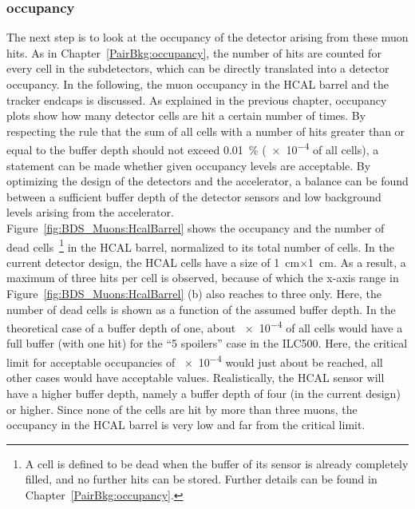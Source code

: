 \subsubsection{\sid occupancy}
\label{BDS_Muons:sidocc}
The next step is to look at the occupancy of the detector arising from these muon hits.
As in Chapter~\ref{PairBkg:occupancy}, the number of hits are counted for every cell in the subdetectors, which can be directly translated into a detector occupancy.
In the following, the muon occupancy in the \sid HCAL barrel and the tracker endcaps is discussed.
As explained in the previous chapter, occupancy plots show how many detector cells are hit a certain number of times. 
By respecting the rule that the sum of all cells with a number of hits greater than or equal to the buffer depth should not exceed \SI{0.01}{\percent} (\num{e-4} of all cells), a statement can be made whether given occupancy levels are acceptable.
By optimizing the design of the detectors and the accelerator, a balance can be found between a sufficient buffer depth of the detector sensors and low background levels arising from the accelerator.
\\Figure~\ref{fig:BDS_Muons:HcalBarrel} shows the occupancy and the number of dead cells~\footnote{A cell is defined to be dead when the buffer of its sensor is already completely filled, and no further hits can be stored. Further details can be found in Chapter~\ref{PairBkg:occupancy}.} in the HCAL barrel, normalized to its total number of cells.
In the current detector design, the HCAL cells have a size of \SI{1}{\centi\meter}$\times$\SI{1}{\centi\meter}.
As a result, a maximum of three hits per cell is observed, because of which the x-axis range in Figure~\ref{fig:BDS_Muons:HcalBarrel} (b) also reaches to three only.
Here, the number of dead cells is shown as a function of the assumed buffer depth.
In the theoretical case of a buffer depth of one, about \num{e-4} of all cells would have a full buffer (with one hit) for the ``5 spoilers'' case in the ILC500.
Here, the critical limit for acceptable occupancies of \num{e-4} would just about be reached, all other cases would have acceptable values.
Realistically, the HCAL sensor will have a higher buffer depth, namely a buffer depth of four (in the current design) or higher.
Since none of the cells are hit by more than three muons, the occupancy in the HCAL barrel is very low and far from the critical limit.
